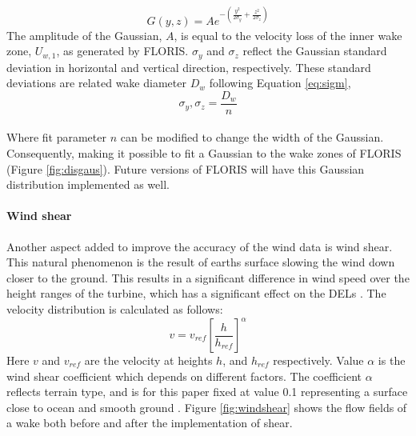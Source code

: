 \begin{equation}
\label{eq:gaus}
G(y, z) = A e^{-\left(\frac{y^2}{2\sigma_y} + \frac{z^2}{2\sigma_z}\right)}
\end{equation}
The amplitude of the Gaussian, $A$, is equal to the velocity loss of the inner wake zone, $U_{w,1}$, as generated by FLORIS. $\sigma_y$ and $\sigma_z$ reflect the Gaussian standard deviation in horizontal and vertical direction, respectively. These standard deviations are related wake diameter $D_{w}$ following Equation \ref{eq:sigm},
\begin{equation}
\label{eq:sigm}
\sigma_y,\sigma_z = \frac{D_{w}}{n} 
\end{equation}
\\
Where fit parameter $n$ can be modified to change the width of the Gaussian. Consequently, making it possible to fit a Gaussian to the wake zones of FLORIS (Figure \ref{fig:disgaus}). Future versions of FLORIS will have this Gaussian distribution implemented as well. 

\paragraph{Wind shear} \label{sec:windshear}
Another aspect added to improve the accuracy of the wind data is wind shear. This natural phenomenon is the result of earths surface slowing the wind down closer to the ground. This results in a significant difference in wind speed over the height ranges of the turbine, which has a significant effect on the DELs \cite{Firtin2011}.  The velocity distribution is calculated as follows: 
\begin{equation}
\label{eq:shear}
v = v_{ref} \left[\frac{h}{h_{ref}}\right]^\alpha
\end{equation}
Here $v$ and $v_{ref}$ are the velocity at heights $h$, and $h_{ref}$  respectively. Value $\alpha$ is the wind shear coefficient which depends on different factors. The coefficient $\alpha$  reflects terrain type, and is for this paper fixed at value 0.1 representing a surface close to ocean and smooth ground \cite{Firtin2011}. Figure \ref{fig:windshear} shows the flow fields of a wake both before and after the implementation of shear.

